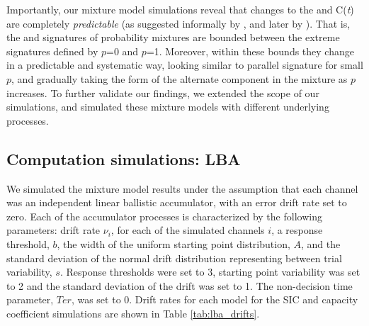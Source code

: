 Importantly, our mixture model simulations reveal that changes to the \SIC and C(\textit{t}) are completely \textit{predictable} (as suggested informally by , and later by ). That is, the \SIC and \Ct signatures of probability mixtures are bounded between the extreme signatures defined by $p$=0 and $p$=1. Moreover, within these bounds they change in a predictable and systematic way, looking similar to parallel signature for small $p$, and gradually taking the form of the alternate component in the mixture as $p$ increases. To further validate our findings, we extended the scope of our simulations, and simulated these mixture models with different underlying processes.

\subsection{Computation simulations: LBA}
We simulated the mixture model results under the assumption that each channel was an independent linear ballistic accumulator, with an error drift rate set to zero. Each of the accumulator processes is characterized by the following parameters: drift rate $\nu_i$, for each of the simulated channels $i$, a response threshold, $b$, the width of the uniform starting point distribution, $A$, and the standard deviation of the normal drift distribution representing between trial variability, $s$. Response thresholds were set to 3, starting point variability was set to 2 and the standard deviation of the drift was set to 1. The non-decision time parameter, $Ter$, was set to 0. Drift rates for each model for the SIC and capacity coefficient simulations are shown in Table \ref{tab:lba_drifts}. 

